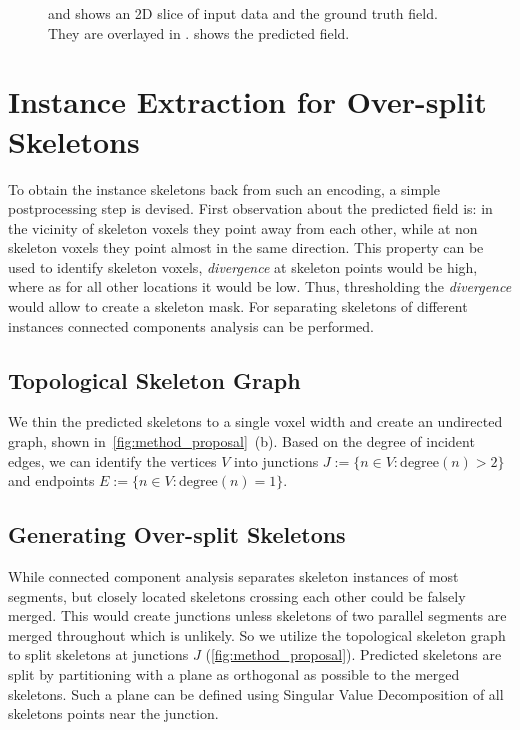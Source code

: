 \begin{figure}[t]
	\caption{ and  shows an 2D slice of input data and the ground truth field. They are overlayed in .  shows the predicted field.}
	\label{fig:learnedField}
\end{figure}

\section{Instance Extraction for Over-split Skeletons}
To obtain the instance skeletons back from such an encoding, a simple postprocessing step is devised. First observation about the predicted field is: in the vicinity of skeleton voxels they point away from each other, while at non skeleton voxels they point almost in the same direction. This property can be used to identify skeleton voxels, {\it divergence} at skeleton points would be high, where as for all other locations it would be low. Thus, thresholding the {\it divergence} would allow to create a skeleton mask. For separating skeletons of different instances connected components analysis can be performed.

\subsection{Topological Skeleton Graph}
We thin the predicted skeletons to a single voxel width and create an undirected graph, shown in~\autoref{fig:method_proposal}~(b). Based on the degree of incident edges, we can identify the vertices $V$ into junctions ${J := \{n \in V : \text{degree}(n) > 2\}}$ and endpoints ${E := \{n \in V : \text{degree}(n) = 1\}}$.

\subsection{Generating Over-split Skeletons}
While connected component analysis separates skeleton instances of most segments, but closely located skeletons crossing each other could be falsely merged. This would create junctions unless skeletons of two parallel segments are merged throughout which is unlikely. So we utilize the topological skeleton graph to split skeletons at junctions $J$ (\autoref{fig:method_proposal}). Predicted skeletons are split by partitioning with a plane as orthogonal as possible to the merged skeletons. Such a plane can be defined using Singular Value Decomposition of all skeletons points near the junction. 

